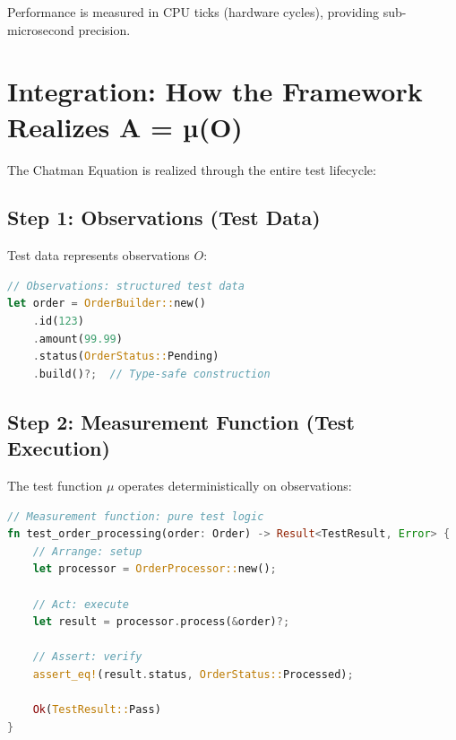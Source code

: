 Performance is measured in CPU ticks (hardware cycles), providing sub-microsecond precision.

\section{Integration: How the Framework Realizes A = µ(O)}

The Chatman Equation is realized through the entire test lifecycle:

\subsection{Step 1: Observations (Test Data)}

Test data represents observations $O$:

\begin{lstlisting}[language=Rust]
// Observations: structured test data
let order = OrderBuilder::new()
    .id(123)
    .amount(99.99)
    .status(OrderStatus::Pending)
    .build()?;  // Type-safe construction
\end{lstlisting}

\subsection{Step 2: Measurement Function (Test Execution)}

The test function $\mu$ operates deterministically on observations:

\begin{lstlisting}[language=Rust]
// Measurement function: pure test logic
fn test_order_processing(order: Order) -> Result<TestResult, Error> {
    // Arrange: setup
    let processor = OrderProcessor::new();

    // Act: execute
    let result = processor.process(&order)?;

    // Assert: verify
    assert_eq!(result.status, OrderStatus::Processed);

    Ok(TestResult::Pass)
}
\end{lstlisting}

